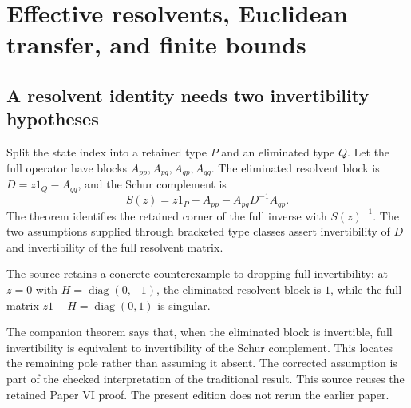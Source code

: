 \section{Effective resolvents, Euclidean transfer, and finite bounds}
\label{sec:finite-limits}

\subsection{A resolvent identity needs two invertibility hypotheses}
Split the state index into a retained type $P$ and an eliminated type $Q$. Let the full operator have blocks $A_{pp},A_{pq},A_{qp},A_{qq}$. The eliminated resolvent block is $D=z1_Q-A_{qq}$, and the Schur complement is
\[
S(z)=z1_P-A_{pp}-A_{pq}D^{-1}A_{qp}.
\]
The theorem identifies the retained corner of the full inverse with $S(z)^{-1}$. The two assumptions supplied through bracketed type classes assert invertibility of $D$ and invertibility of the full resolvent matrix.




The source retains a concrete counterexample to dropping full invertibility: at $z=0$ with $H=\operatorname{diag}(0,-1)$, the eliminated resolvent block is $1$, while the full matrix $z1-H=\operatorname{diag}(0,1)$ is singular.


The companion  theorem says that, when the eliminated block is invertible, full invertibility is equivalent to invertibility of the Schur complement. This locates the remaining pole rather than assuming it absent. The corrected assumption is part of the checked interpretation of the traditional result. This source reuses the retained Paper VI proof. The present edition does not rerun the earlier paper.

